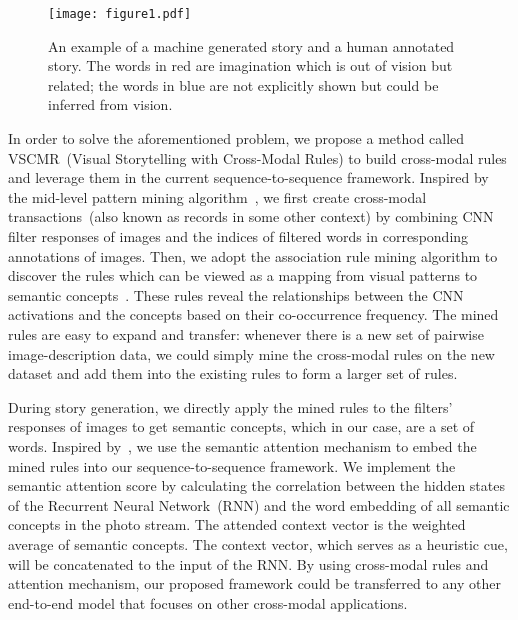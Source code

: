 \documentclass[sigconf]{acmart}
\begin{document}
\begin{figure}[htbp]
\centering 
\texttt{[image: figure1.pdf]} 
\caption{An example of a machine generated story and a human annotated story. The words in red are imagination which is out of vision but related; the words in blue are not explicitly shown but could be inferred from vision.} 
\label{figure1}
\end{figure}

In order to solve the aforementioned problem, we propose a method called VSCMR~(Visual Storytelling with Cross-Modal Rules) to build cross-modal rules and leverage them in the current sequence-to-sequence framework. Inspired by the mid-level pattern mining algorithm~\cite{li2015mid}, we first create cross-modal transactions~(also known as records in some other context) by combining CNN filter responses of images and the indices of filtered words in corresponding annotations of images. Then, we adopt the association rule mining algorithm to discover the rules which can be viewed as a mapping from visual patterns to semantic concepts~\cite{agrawal1993mining}. These rules reveal the relationships between the CNN activations and the concepts based on their co-occurrence frequency. The mined rules are easy to expand and transfer: whenever there is a new set of pairwise image-description data, we could simply mine the cross-modal rules on the new dataset and add them into the existing rules to form a larger set of rules.

During story generation, we directly apply the mined rules to the filters' responses of images to get semantic concepts, which in our case, are a set of words. Inspired by~\cite{you2016image}, we use the semantic attention mechanism to embed the mined rules into our sequence-to-sequence framework. We implement the semantic attention score by calculating the correlation between the hidden states of the Recurrent Neural Network~(RNN) and the word embedding of all semantic concepts in the photo stream. The attended context vector is the weighted average of semantic concepts. The context vector, which serves as a heuristic cue, will be concatenated to the input of the RNN. By using cross-modal rules and attention mechanism, our proposed framework could be transferred to any other end-to-end model that focuses on other cross-modal applications.
\end{document}
